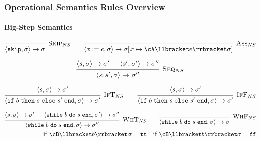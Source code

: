 \newpage
\subsubsection{Operational Semantics Rules Overview}
\paragraph{Big-Step Semantics}
\[
    \begin{prooftree}
        \infer0[\textsc{Skip}$_{NS}$]{\langle \texttt{skip}, \sigma \rangle \rightarrow \sigma}
    \end{prooftree}
    \qquad
    \begin{prooftree}
        \infer0[\textsc{Ass}$_{NS}$]{\langle x := e, \sigma \rangle \rightarrow \sigma[x \mapsto \cA\llbracket e \rrbracket \sigma ]}
    \end{prooftree}
\]

\[
    \begin{prooftree}
        \hypo{\langle s, \sigma \rangle \rightarrow \sigma'}
        \hypo{\langle s', \sigma' \rangle \rightarrow \sigma''}
        \infer2[\textsc{Seq}$_{NS}$]{\langle s;s', \sigma \rangle \rightarrow \sigma''}
    \end{prooftree}
\]

\[
    \begin{prooftree}
        \hypo{\langle s, \sigma \rangle \rightarrow \sigma'}
        \infer1[\textsc{IfT}$_{NS}$]{\langle \texttt{if}\; b \; \texttt{then} \; s \; \texttt{else} \; s' \; \texttt{end}, \sigma \rangle \rightarrow \sigma'}
    \end{prooftree}
    \qquad
    \begin{prooftree}
        \hypo{\langle s, \sigma \rangle \rightarrow \sigma'}
        \infer1[\textsc{IfF}$_{NS}$]{\langle \texttt{if}\; b \; \texttt{then} \; s \; \texttt{else} \; s' \; \texttt{end}, \sigma \rangle \rightarrow \sigma'}
    \end{prooftree}
\]

\begin{align*}
    \begin{prooftree}
        \hypo{\langle s, \sigma \rangle \rightarrow \sigma'}
        \hypo{\langle \texttt{while} \; b \; \texttt{do} \; s \; \texttt{end}, \sigma' \rangle \rightarrow \sigma''}
        \infer2[\textsc{WhT}$_{NS}$]{\langle \texttt{while} \; b \; \texttt{do} \; s \; \texttt{end}, \sigma \rangle \rightarrow \sigma''}
    \end{prooftree}
     &  &
    \begin{prooftree}
        \infer0[\textsc{WhF}$_{NS}$]{\langle \texttt{while} \; b \; \texttt{do} \; s \; \texttt{end}, \sigma \rangle \rightarrow \sigma}
    \end{prooftree} \\
    \text{if }
    \cB\llbracket b \rrbracket \sigma = \texttt{tt}
     &  &
    \text{if }
    \cB\llbracket b \rrbracket \sigma = \texttt{ff}
\end{align*}

